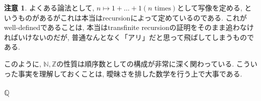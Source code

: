 \documentclass[a4paper, twoside]{bxjsarticle}
\newcommand{\nat}{\mathbb{N}}
\newcommand{\zah}{\mathbb{Z}}
\newcommand{\quo}{\mathbb{Q}}
\theoremstyle{definition}
\newtheorem{rem}[thm]{注意}
\begin{document}
        \begin{rem}
            よくある論法として, $n\mapsto 1+\dots +1(n \mbox{ times})$として写像を定める, というものがあるがこれは本当はrecursionによって定めているのである. これがwell-definedであることは, 本当はtransfinite recursionの証明をそのまま追わなければいけないのだが, 普通なんとなく「アリ」だと思って飛ばしてしまうものである.
            
            このように, $\nat, \zah$の性質は順序数としての構成が非常に深く関わっている. こういった事実を理解しておくことは, 曖昧さを排した数学を行う上で大事である.
        \end{rem}
    \subsubsection{$\quo$}
    
\end{document}
